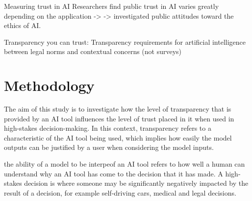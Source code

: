 \documentclass[manuscript,screen,review]{acmart}
\begin{document}
Measuring trust in AI
Researchers find public trust in AI varies greatly depending on the application -> %
-> investigated public attitudes toward the ethics of AI.

Transparency you can trust: Transparency requirements for artificial intelligence between legal norms and contextual concerns (not surveys)

\section{Methodology}


The aim of this study is to investigate how the level of transparency that is provided by an AI tool influences the level of trust placed in it when used in high-stakes decision-making. In this context, transparency refers to a characteristic of the AI tool being used, which implies how easily the model outputs can be justified by a user when considering the model inputs.

the ability of a model to be interpeof an AI tool refers to how well a human can understand why an AI tool has come to the decision that it has made. A high-stakes decision is where someone may be significantly negatively impacted by the result of a decision, for example self-driving cars, medical and legal decisions.


\end{document}
